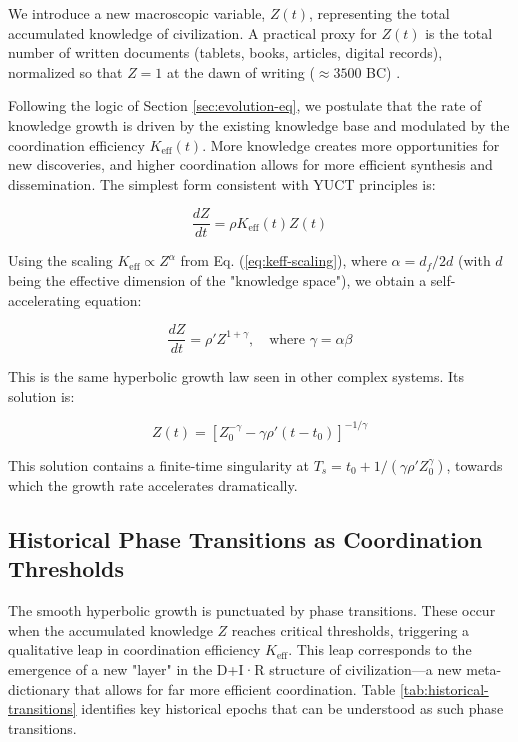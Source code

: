 \documentclass[12pt,a4paper]{article}
\theoremstyle{remark}
\newcommand{\df}{d_{\!f}}
\begin{document}
	We introduce a new macroscopic variable, $Z(t)$, representing the total accumulated knowledge of civilization. A practical proxy for $Z(t)$ is the total number of written documents (tablets, books, articles, digital records), normalized so that $Z=1$ at the dawn of writing ($\approx 3500$ BC) \cite{Buringh2009, Desai2026}.
	
	Following the logic of Section \ref{sec:evolution-eq}, we postulate that the rate of knowledge growth is driven by the existing knowledge base and modulated by the coordination efficiency $K_{\text{eff}}(t)$. More knowledge creates more opportunities for new discoveries, and higher coordination allows for more efficient synthesis and dissemination. The simplest form consistent with YUCT principles is:
	
	\begin{equation}
		\frac{dZ}{dt} = \rho K_{\text{eff}}(t) Z(t)
		\label{eq:Z-growth}
	\end{equation}
	
	Using the scaling $K_{\text{eff}} \propto Z^{\alpha}$ from Eq. (\ref{eq:keff-scaling}), where $\alpha = \df/2d$ (with $d$ being the effective dimension of the "knowledge space"), we obtain a self-accelerating equation:
	
	\begin{equation}
		\frac{dZ}{dt} = \rho' Z^{1+\gamma}, \quad \text{where } \gamma = \alpha \beta
		\label{eq:Z-self-accel}
	\end{equation}
	
	This is the same hyperbolic growth law seen in other complex systems. Its solution is:
	
	\begin{equation}
		Z(t) = \left[ Z_0^{-\gamma} - \gamma \rho' (t - t_0) \right]^{-1/\gamma}
		\label{eq:Z-hyperbolic}
	\end{equation}
	
	This solution contains a finite-time singularity at $T_s = t_0 + 1/(\gamma \rho' Z_0^{\gamma})$, towards which the growth rate accelerates dramatically.
	
	\subsection{Historical Phase Transitions as Coordination Thresholds}
	
	The smooth hyperbolic growth is punctuated by phase transitions. These occur when the accumulated knowledge $Z$ reaches critical thresholds, triggering a qualitative leap in coordination efficiency $K_{\text{eff}}$. This leap corresponds to the emergence of a new "layer" in the D+I·R structure of civilization—a new meta-dictionary that allows for far more efficient coordination. Table \ref{tab:historical-transitions} identifies key historical epochs that can be understood as such phase transitions.
	
\end{document}
